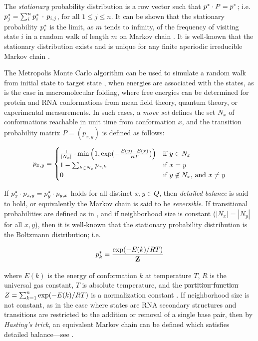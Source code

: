 \documentclass[11pt, oneside]{Thesis} %
\providecommand{\DIFadd}[1]{{\protect\color{blue}\uwave{#1}}} %
\providecommand{\DIFdel}[1]{{\protect\color{red}\sout{#1}}}                      %
\providecommand{\DIFaddbegin}{} %
\providecommand{\DIFaddend}{} %
\providecommand{\DIFdelbegin}{} %
\providecommand{\DIFdelend}{} %
\begin{document}
The {\em stationary} probability distribution \statDist
is a row vector such that $p^* \cdot P = p^*$; i.e.
$p^*_j = \sum_{i}^n p^*_i\, \cdot\, p_{i,j}$, for all $1\leq j \leq n$.
It can be shown that the stationary probability $p^*_i$ is the limit,
as $m$ tends to infinity, of the frequency of visiting state $i$ in a
random walk of length $m$ on Markov chain \mChain.
It is well-known that the stationary distribution exists and is unique
for any finite aperiodic irreducible Markov chain \citep{cloteBackofen:book}.

The Metropolis Monte Carlo algorithm \citep{metropolis:MonteCarlo} can
be used to simulate a random walk from initial state \xStart to target state
\xEnd, when energies are associated with the states, as is the case in
macromolecular folding, where free energies can be determined for
protein and RNA conformations from mean field theory, quantum theory,
or experimental measurements. In such cases, a {\em move set}
defines the set $N_x$ of conformations reachable in unit time
from conformation $x$, and the transition probability matrix
$P = (p_{x,y})$ is defined as follows:

\begin{align}
\label{eq:hermes:mfptXitionProb}
p_{x,y} =
\begin{cases}
\frac{1}{|N_x|} \cdot \min\left( 1, \boltzYmX \right)
& \text{if $y \in N_x$} \\
1 - \sum_{k \in N_x} p_{x,k} & \text{if $x=y$} \\
0 & \text{if $y \not\in N_x$, and $x \ne y$} \\
\end{cases}
\end{align}

If $p^*_x \cdot p_{x,y} = p^*_y \cdot p_{y,x}$ holds for all distinct
$x,y \in Q$, then
{\em detailed balance} is said to hold, or equivalently the Markov
chain \mChain is said to be {\em reversible}.
If transitional probabilities
are defined as in , and if neighborhood
size is constant ($|N_x|=|N_y|$ for all $x,y$), then it is well-known
that the stationary probability distribution
\statDist is the Boltzmann distribution; i.e.

\begin{align}
\label{eq:hermes:stationaryBoltzmannProb}
\pSt_k = \frac{\boltzf{k}}{\fullZ}
\end{align}

where $E(k)$ is the energy of conformation $k$ at temperature $T$,
$R$ is the universal gas constant,
$T$ is absolute temperature, and the \DIFdelbegin %
\DIFdel{partition function
}%
\DIFdel{$Z = \sum_{k=1}^n \exp(-E(k)/RT)$ }\DIFdelend \DIFaddbegin \DIFadd{partition function
$\fullZ = \sum_{k=1}^n \boltzf{k}$ }\DIFaddend is a normalization constant
\citep{waterman:book,cloteBackofen:book}. If neighborhood size is not
constant, as in the case where states are RNA secondary structures and transitions
are restricted to the addition or removal of a single base pair, then
by {\em Hasting's trick}, an equivalent Markov chain can be defined which
satisfies detailed balance---see .
\end{document}
